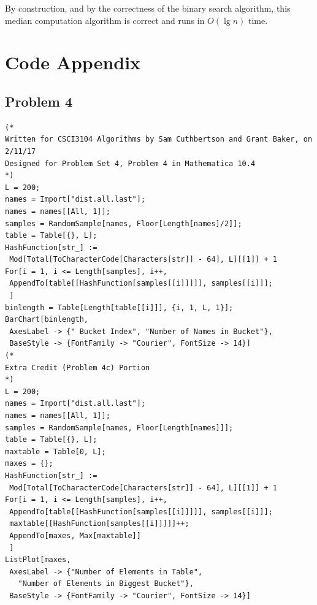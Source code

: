 \documentclass[12pt]{article}
\begin{document}
\begin{enumerate}
    By construction, and by the correctness of the binary search algorithm, this median computation algorithm is correct and runs in $O(\lg n)$ time.

    

    \newpage
    \section*{Code Appendix}
    \subsection*{Problem 4}
    \begin{Verbatim}[fontsize=\footnotesize]
(*
Written for CSCI3104 Algorithms by Sam Cuthbertson and Grant Baker, on 2/11/17
Designed for Problem Set 4, Problem 4 in Mathematica 10.4
*)
L = 200;
names = Import["dist.all.last"];
names = names[[All, 1]];
samples = RandomSample[names, Floor[Length[names]/2]];
table = Table[{}, L];
HashFunction[str_] := 
 Mod[Total[ToCharacterCode[Characters[str]] - 64], L][[1]] + 1
For[i = 1, i <= Length[samples], i++,
 AppendTo[table[[HashFunction[samples[[i]]]]], samples[[i]]];
 ]
binlength = Table[Length[table[[i]]], {i, 1, L, 1}];
BarChart[binlength, 
 AxesLabel -> {" Bucket Index", "Number of Names in Bucket"}, 
 BaseStyle -> {FontFamily -> "Courier", FontSize -> 14}]
(*
Extra Credit (Problem 4c) Portion
*)
L = 200;
names = Import["dist.all.last"];
names = names[[All, 1]];
samples = RandomSample[names, Floor[Length[names]]];
table = Table[{}, L];
maxtable = Table[0, L];
maxes = {};
HashFunction[str_] := 
 Mod[Total[ToCharacterCode[Characters[str]] - 64], L][[1]] + 1
For[i = 1, i <= Length[samples], i++,
 AppendTo[table[[HashFunction[samples[[i]]]]], samples[[i]]];
 maxtable[[HashFunction[samples[[i]]]]]++;
 AppendTo[maxes, Max[maxtable]]
 ]
ListPlot[maxes, 
 AxesLabel -> {"Number of Elements in Table", 
   "Number of Elements in Biggest Bucket"}, 
 BaseStyle -> {FontFamily -> "Courier", FontSize -> 14}]
    \end{Verbatim}
\end{enumerate}

\newpage
\end{document}
